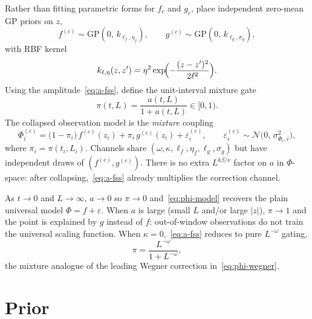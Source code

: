\documentclass[11pt]{article}
\begin{document}
Rather than fitting parametric forms for $f_c$ and $g_c$, place
independent zero-mean GP priors on $z$,
\begin{equation}
  f^{(c)} \sim \mathrm{GP}(0,\, k_{\ell_f,\eta_f}),
  \qquad
  g^{(c)} \sim \mathrm{GP}(0,\, k_{\ell_g,\sigma_g}),
\end{equation}
with RBF kernel
\begin{equation}
  k_{\ell,\eta}(z,z')
    = \eta^2
      \exp\!\Bigl(-\frac{(z-z')^2}{2\ell^2}\Bigr).
\end{equation}
Using the amplitude~\eqref{eq:a-fss}, define the unit-interval mixture gate
\begin{equation}
  \label{eq:pi-gate}
  \pi(t,L)
    = \frac{a(t,L)}{1 + a(t,L)}
    \in [0,1).
\end{equation}
The collapsed observation model is the \emph{mixture} coupling
\begin{equation}
  \label{eq:phi-model}
  \Phi^{(c)}_i
    = \bigl(1-\pi_i\bigr)\, f^{(c)}(z_i)
      + \pi_i\, g^{(c)}(z_i)
      + \varepsilon^{(c)}_i,
  \qquad
  \varepsilon^{(c)}_i
    \sim \mathcal{N}\!\bigl(0,\, \sigma_{\Phi_c,i}^2\bigr),
\end{equation}
where $\pi_i = \pi(t_i,L_i)$.
Channels share $(\omega,\kappa,\ell_f,\eta_f,\ell_g,\sigma_g)$ but have
independent draws of $(f^{(c)},g^{(c)})$.
There is no extra $L^{k\beta/\nu}$ factor on $a$ in $\Phi$-space: after
collapsing,~\eqref{eq:a-fss} already multiplies the correction channel.

As $t\to 0$ and $L\to\infty$, $a\to 0$ so $\pi\to 0$
and~\eqref{eq:phi-model} recovers the plain universal model
$\Phi = f + \varepsilon$.
When $a$ is large (small $L$ and/or large $|z|$), $\pi\to 1$ and the point
is explained by $g$ instead of $f$: out-of-window observations do not train
the universal scaling function.
When $\kappa=0$,~\eqref{eq:a-fss} reduces to pure $L^{-\omega}$ gating,
\begin{equation}
  \pi = \frac{L^{-\omega}}{1+L^{-\omega}},
\end{equation}
the mixture analogue of the leading Wegner correction
in~\eqref{eq:phi-wegner}.

\section{Prior}
\end{document}
